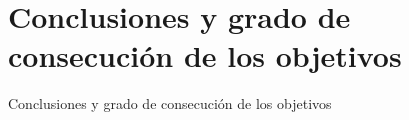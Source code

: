 \section{Conclusiones y grado de consecución de los objetivos}
    Conclusiones y grado de consecución de los objetivos